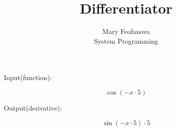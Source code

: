 \documentclass[12pt]{article}
\begin{document}
\title{Differentiator}
\author{Mary Feofanova\\
System Programming}
 
\maketitle
\begin{center}
Input(function):
\end{center}
$$\cos(-x \cdot 5)$$
\begin{center}
Output(derivative):
\end{center}
$$\sin(-x \cdot 5) \cdot 5$$
\end{document}
